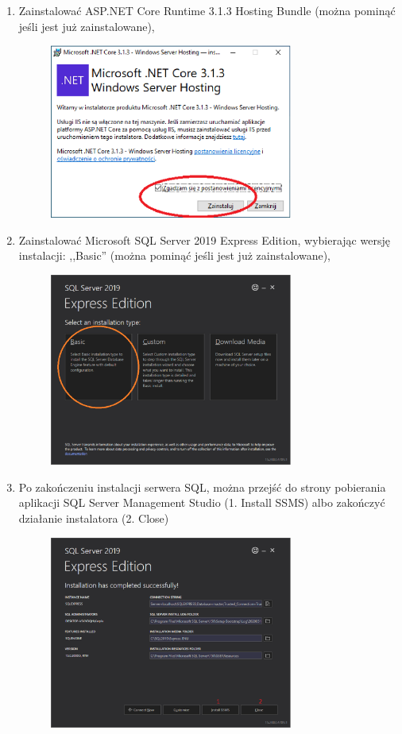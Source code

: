 \documentclass[12pt,a4paper]{article}
\begin{document}
\begin{enumerate}
				\item Zainstalować ASP.NET Core Runtime 3.1.3 Hosting Bundle (można pominąć jeśli jest już zainstalowane),
					\begin{figure}[H]
						\centering
						\includegraphics[width=8cm]{img/Local_Install_3.eps}
					\end{figure}
					
				\item Zainstalować Microsoft SQL Server 2019 Express Edition, wybierając wersję instalacji: ,,Basic'' (można pominąć jeśli jest już zainstalowane),
					\begin{figure}[H]
						\centering
						\includegraphics[width=8cm]{img/Local_Install_4.eps}
					\end{figure}
					
				\item Po zakończeniu instalacji serwera SQL, można przejść do strony pobierania aplikacji SQL Server Management Studio (1. Install SSMS) albo zakończyć działanie
					instalatora (2. Close)
					\begin{figure}[H]
						\centering
						\includegraphics[width=8cm]{img/Local_Install_5.eps}
					\end{figure}		
							

\end{enumerate}
\end{document}
